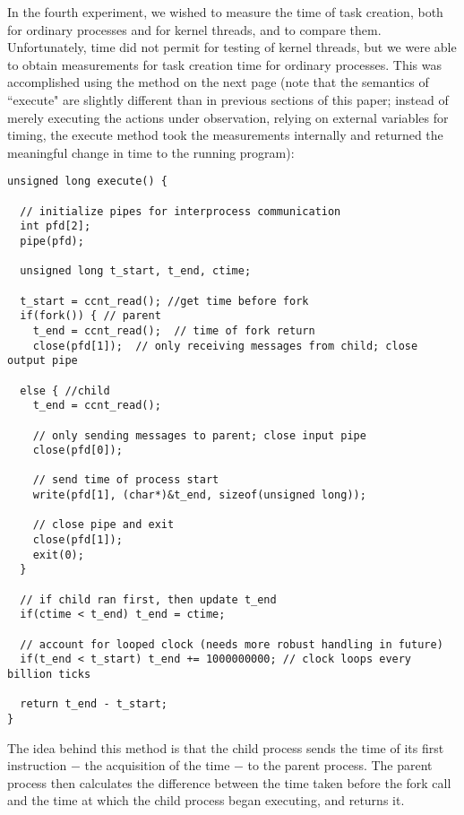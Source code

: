 In the fourth experiment, we wished to measure the time of task creation, both for ordinary processes and for kernel threads, and to compare them. Unfortunately, time did not permit for testing of kernel threads, but we were able to obtain measurements for task creation time for ordinary processes. This was accomplished using the method on the next page (note that the semantics of ``execute" are slightly different than in previous sections of this paper; instead of merely executing the actions under observation, relying on external variables for timing, the execute method took the measurements internally and returned the meaningful change in time to the running program):

\newpage

\noindent \begin{verbatim}
unsigned long execute() {
  
  // initialize pipes for interprocess communication
  int pfd[2];
  pipe(pfd);

  unsigned long t_start, t_end, ctime;

  t_start = ccnt_read(); //get time before fork
  if(fork()) { // parent
    t_end = ccnt_read();  // time of fork return
    close(pfd[1]);  // only receiving messages from child; close output pipe

  else { //child
    t_end = ccnt_read();
 
    // only sending messages to parent; close input pipe
    close(pfd[0]);

    // send time of process start
    write(pfd[1], (char*)&t_end, sizeof(unsigned long));

    // close pipe and exit
    close(pfd[1]);
    exit(0);
  }

  // if child ran first, then update t_end
  if(ctime < t_end) t_end = ctime;
  
  // account for looped clock (needs more robust handling in future)
  if(t_end < t_start) t_end += 1000000000; // clock loops every billion ticks

  return t_end - t_start;
}
\end{verbatim}

\newpage

The idea behind this method is that the child process sends the time of its first instruction $-$ the acquisition of the time $-$ to the parent process. The parent process then calculates the difference between the time taken before the fork call and the time at which the child process began executing, and returns it.

